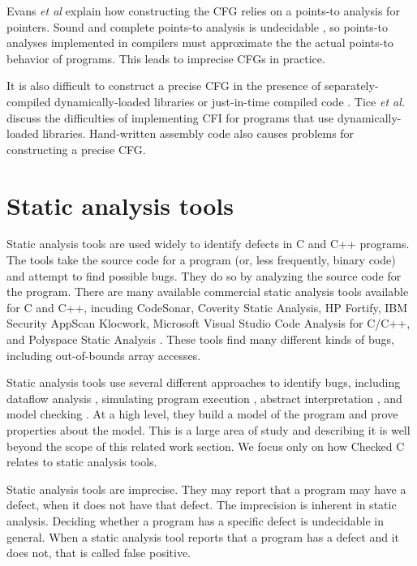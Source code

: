 Evans {\it et al} \cite{Evans2015} explain how constructing the CFG relies on a
points-to analysis for pointers.  Sound and complete points-to analysis is 
undecidable \cite{Ramalingam1994}, so points-to analyses implemented in compilers 
must approximate the the actual points-to behavior of programs.  This leads to 
imprecise CFGs in practice.

It is also difficult to construct a precise CFG in the presence of 
separately-compiled dynamically-loaded libraries \cite{NiuPLDI2014} or just-in-time
compiled code \cite{NiuCCS2014}.  Tice {\it et al.} \cite{Tice2014} discuss the difficulties of implementing CFI for programs that use dynamically-loaded libraries. 
Hand-written assembly code also causes problems for constructing a precise CFG.

\section{Static analysis tools}

Static analysis tools are used widely to identify defects in C and C++ programs.
The tools take the source code for a program (or, less frequently, binary
code) and attempt to find possible bugs.  They do so by analyzing the source
code for the program.  There are many available commercial static analysis tools
available for C and C++, incuding CodeSonar, Coverity Static Analysis, HP Fortify, 
IBM Security AppScan Klocwork, Microsoft Visual Studio Code Analysis for C/C++, and Polyspace Static Analysis \cite{Bessey2010,Bush2000,Emanuelsson2008}.    
These tools find many different kinds of bugs, including out-of-bounds array accesses.

Static analysis tools use several different approaches to identify bugs,
including dataflow analysis \cite{Aho2007,Shahriar2010}, simulating program 
execution \cite{Bush2000},  abstract interpretation \cite{Cousot1977}, 
and model checking
\cite{Larus2004}. At a high level, they build a  model of the program and 
prove properties about the model.  This is a large area of study and describing 
it is well beyond the scope of this related work section. We focus only on how
Checked C relates to static analysis tools.

Static analysis tools are imprecise.   They may report that a program
may have a defect, when it does not have that defect.  The imprecision
is inherent in static analysis.  Deciding whether a program has a specific defect is
undecidable in general.  When a static analysis tool reports that a program has a 
defect  and it does not, that is called false positive.

